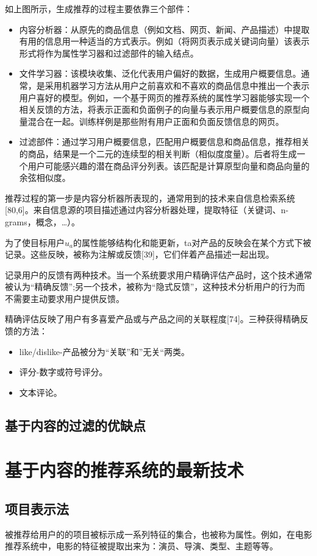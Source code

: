 如上图所示，生成推荐的过程主要依靠三个部件：
\begin{itemize}
	\item 内容分析器：从原先的商品信息（例如文档、网页、新闻、产品描述）中提取有用的信息用一种适当的方式表示。例如（将网页表示成关键词向量）该表示形式将作为属性学习器和过滤部件的输入结点。
	\item 文件学习器：该模块收集、泛化代表用户偏好的数据，生成用户概要信息。通常，是采用机器学习方法从用户之前喜欢和不喜欢的商品信息中推出一个表示用户喜好的模型。例如，一个基于网页的推荐系统的属性学习器能够实现一个相关反馈的方法，将表示正面和负面例子的向量与表示用户概要信息的原型向量混合在一起。训练样例是那些附有用户正面和负面反馈信息的网页。
	\item  过滤部件：通过学习用户概要信息，匹配用户概要信息和商品信息，推荐相关的商品，结果是一个二元的连续型的相关判断（相似度度量）。后者将生成一个用户可能感兴趣的潜在商品评分列表。该匹配是计算原型向量和商品向量的余弦相似度。
\end{itemize} 

推荐过程的第一步是内容分析器所表现的，通常用到的技术来自信息检索系统[80,6]。来自信息源的项目描述通过内容分析器处理，提取特征（关键词、n-grams，概念，\dots）。

为了使目标用户$ u_a $的属性能够结构化和能更新，ta对产品的反映会在某个方式下被记录。这些反映，被称为注解或反馈[39]，它们伴着产品描述一起出现。

记录用户的反馈有两种技术。当一个系统要求用户精确评估产品时，这个技术通常被认为“精确反馈”;另一个技术，被称为“隐式反馈”，这种技术分析用户的行为而不需要主动要求用户提供反馈。

精确评估反映了用户有多喜爱产品或与产品之间的关联程度[74]。三种获得精确反馈的方法：
\begin{itemize}
	\item like/dislike-产品被分为“关联”和”无关“两类。 
	\item 评分-数字或符号评分。
	\item 文本评论。
\end{itemize}

\subsection{基于内容的过滤的优缺点}

\section{基于内容的推荐系统的最新技术}

\subsection{项目表示法}
被推荐给用户的的项目被标示成一系列特征的集合，也被称为属性。例如，在电影推荐系统中，电影的特征被提取出来为：演员、导演、类型、主题等等。

